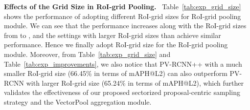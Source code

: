 \documentclass[natbib,twocolumn]{svjour3}          \smartqed  \usepackage{graphicx}
\begin{document}
\begin{table}
	\begin{center}
	\end{center}
	\caption{Effects of the grid size in RoI-grid pooling module. All experiments are based on our PV-RCNN++ framework with a center-based head for proposal generation.}
	\label{tab:exp_grid_size}
\end{table}



\noindent
\textbf{Effects of the Grid Size in RoI-grid Pooling.}~
Table~\ref{tab:exp_grid_size} shows the performance of adopting different RoI-grid sizes for RoI-grid pooling module. We can see that the performance increases along with the RoI-grid sizes from  to , and the settings with larger RoI-grid sizes than  achieve similar performance. 
Hence we finally adopt RoI-grid size  for the RoI-grid pooling module. 
Moreover, from Table~\ref{tab:exp_grid_size} and Table~\ref{tab:exp_improvements}, we also notice that PV-RCNN++ with a much smaller RoI-grid size  (66.45\% in terms of mAPH@L2) can also outperform PV-RCNN with larger RoI-grid size  (65.24\% in terms of mAPH@L2), which further validates the effectiveness of our proposed sectorized proposal-centric sampling strategy and the VectorPool aggregation module.
\end{document}
